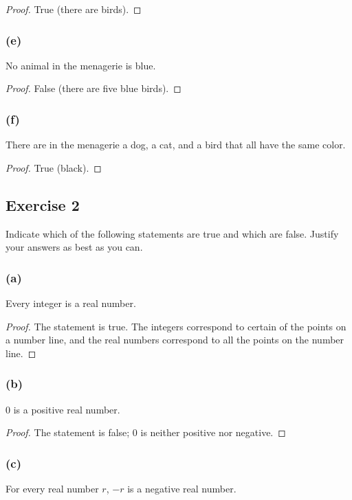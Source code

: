 \documentclass[14pt]{extarticle}
\begin{document}
\begin{proof}
True (there are birds).
\end{proof}

\subsubsection{(e)}
No animal in the menagerie is blue.

\begin{proof}
False (there are five blue birds).
\end{proof}

\subsubsection{(f)}
There are in the menagerie a dog, a cat, and a bird that all have the same color.

\begin{proof}
True (black).
\end{proof}

\subsection{Exercise 2}
Indicate which of the following statements are true and which are false. Justify your answers as best as you can.

\subsubsection{(a)}
Every integer is a real number.

\begin{proof}
The statement is true. The integers correspond to certain of the points on a number line, and the real numbers correspond to all the points on the number line.
\end{proof}

\subsubsection{(b)}
0 is a positive real number.

\begin{proof}
The statement is false; 0 is neither positive nor negative.
\end{proof}

\subsubsection{(c)}
For every real number $r$, $-r$ is a negative real number.
\end{document}
